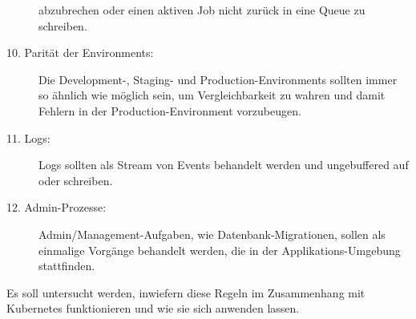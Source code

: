 \begin{description}
  abzubrechen
  oder einen aktiven Job nicht zurück in eine Queue zu schreiben.
  \item[10. Parität der Environments:]
  Die Development-, Staging- und Production-Environments sollten immer so ähnlich wie möglich sein,
  um Vergleichbarkeit zu wahren und damit Fehlern in der Production-Environment
  vorzubeugen.
  \item[11. Logs:]
  Logs sollten als Stream von Events behandelt werden und ungebuffered
  auf  oder  schreiben.
  \item[12. Admin-Prozesse:]
  Admin/Management-Aufgaben, wie Datenbank-Migrationen, sollen
  als einmalige Vorgänge behandelt werden, die in der Applikations-Umgebung
  stattfinden.
\end{description}

Es soll untersucht werden, inwiefern diese Regeln im Zusammenhang mit Kubernetes
funktionieren und wie sie sich anwenden lassen.
